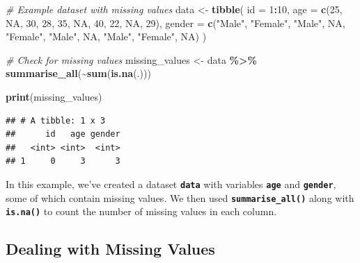 \documentclass[
]{book}
\newenvironment{Shaded}{\begin{snugshade}}{\end{snugshade}}
\newcommand{\AttributeTok}[1]{\textcolor[rgb]{0.13,0.29,0.53}{#1}}
\newcommand{\CommentTok}[1]{\textcolor[rgb]{0.56,0.35,0.01}{\textit{#1}}}
\newcommand{\ConstantTok}[1]{\textcolor[rgb]{0.56,0.35,0.01}{#1}}
\newcommand{\DecValTok}[1]{\textcolor[rgb]{0.00,0.00,0.81}{#1}}
\newcommand{\FunctionTok}[1]{\textcolor[rgb]{0.13,0.29,0.53}{\textbf{#1}}}
\newcommand{\NormalTok}[1]{#1}
\newcommand{\OtherTok}[1]{\textcolor[rgb]{0.56,0.35,0.01}{#1}}
\newcommand{\SpecialCharTok}[1]{\textcolor[rgb]{0.81,0.36,0.00}{\textbf{#1}}}
\newcommand{\StringTok}[1]{\textcolor[rgb]{0.31,0.60,0.02}{#1}}
\begin{document}
\begin{Shaded}
\begin{Highlighting}[]
\CommentTok{\# Example dataset with missing values}
\NormalTok{data }\OtherTok{\textless{}{-}} \FunctionTok{tibble}\NormalTok{(}
  \AttributeTok{id =} \DecValTok{1}\SpecialCharTok{:}\DecValTok{10}\NormalTok{,}
  \AttributeTok{age =} \FunctionTok{c}\NormalTok{(}\DecValTok{25}\NormalTok{, }\ConstantTok{NA}\NormalTok{, }\DecValTok{30}\NormalTok{, }\DecValTok{28}\NormalTok{, }\DecValTok{35}\NormalTok{, }\ConstantTok{NA}\NormalTok{, }\DecValTok{40}\NormalTok{, }\DecValTok{22}\NormalTok{, }\ConstantTok{NA}\NormalTok{, }\DecValTok{29}\NormalTok{),}
  \AttributeTok{gender =} \FunctionTok{c}\NormalTok{(}\StringTok{"Male"}\NormalTok{, }\StringTok{"Female"}\NormalTok{, }\StringTok{"Male"}\NormalTok{, }\ConstantTok{NA}\NormalTok{, }\StringTok{"Female"}\NormalTok{, }\StringTok{"Male"}\NormalTok{, }\ConstantTok{NA}\NormalTok{, }\StringTok{"Male"}\NormalTok{, }\StringTok{"Female"}\NormalTok{, }\ConstantTok{NA}\NormalTok{)}
\NormalTok{)}

\CommentTok{\# Check for missing values}
\NormalTok{missing\_values }\OtherTok{\textless{}{-}}\NormalTok{ data }\SpecialCharTok{\%\textgreater{}\%}
  \FunctionTok{summarise\_all}\NormalTok{(}\SpecialCharTok{\textasciitilde{}}\FunctionTok{sum}\NormalTok{(}\FunctionTok{is.na}\NormalTok{(.)))}

\FunctionTok{print}\NormalTok{(missing\_values)}
\end{Highlighting}
\end{Shaded}

\begin{verbatim}
## # A tibble: 1 x 3
##      id   age gender
##   <int> <int>  <int>
## 1     0     3      3
\end{verbatim}

In this example, we've created a dataset \textbf{\texttt{data}} with variables \textbf{\texttt{age}} and \textbf{\texttt{gender}}, some of which contain missing values. We then used \textbf{\texttt{summarise\_all()}} along with \textbf{\texttt{is.na()}} to count the number of missing values in each column.

\hypertarget{dealing-with-missing-values}{%
\subsection{\texorpdfstring{\textbf{Dealing with Missing Values}}{Dealing with Missing Values}}\label{dealing-with-missing-values}}
\end{document}
